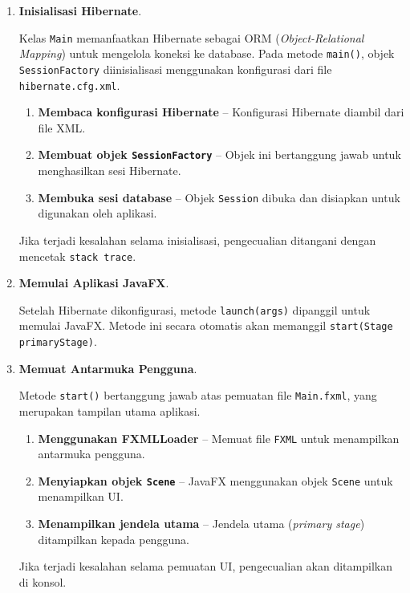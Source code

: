 \begin{enumerate}
	\item \textbf{Inisialisasi Hibernate}.
	
	Kelas \texttt{Main} memanfaatkan Hibernate sebagai ORM (\textit{Object-Relational Mapping}) untuk mengelola koneksi ke database. Pada metode \texttt{main()}, objek \texttt{SessionFactory} diinisialisasi menggunakan konfigurasi dari file \texttt{hibernate.cfg.xml}. 
	
	\begin{enumerate}
		\item \textbf{Membaca konfigurasi Hibernate} – Konfigurasi Hibernate diambil dari file XML.
		\item \textbf{Membuat objek \texttt{SessionFactory}} – Objek ini bertanggung jawab untuk menghasilkan sesi Hibernate.
		\item \textbf{Membuka sesi database} – Objek \texttt{Session} dibuka dan disiapkan untuk digunakan oleh aplikasi.
	\end{enumerate}
	
	Jika terjadi kesalahan selama inisialisasi, pengecualian ditangani dengan mencetak \texttt{stack trace}.
	
	\item \textbf{Memulai Aplikasi JavaFX}.
	
	Setelah Hibernate dikonfigurasi, metode \texttt{launch(args)} dipanggil untuk memulai JavaFX. Metode ini secara otomatis akan memanggil \texttt{start(Stage primaryStage)}.
	
	\item \textbf{Memuat Antarmuka Pengguna}.
	
	Metode \texttt{start()} bertanggung jawab atas pemuatan file \texttt{Main.fxml}, yang merupakan tampilan utama aplikasi.
	
	\begin{enumerate}
		\item \textbf{Menggunakan FXMLLoader} – Memuat file \texttt{FXML} untuk menampilkan antarmuka pengguna.
		\item \textbf{Menyiapkan objek \texttt{Scene}} – JavaFX menggunakan objek \texttt{Scene} untuk menampilkan UI.
		\item \textbf{Menampilkan jendela utama} – Jendela utama (\textit{primary stage}) ditampilkan kepada pengguna.
	\end{enumerate}
	
	Jika terjadi kesalahan selama pemuatan UI, pengecualian akan ditampilkan di konsol.
	

\end{enumerate}
